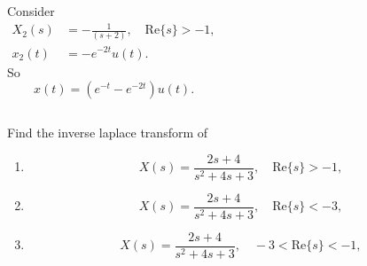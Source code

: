 \begin{frame}[t]{}
    {
        \begin{solution}\end{solution}
            \begin{columns}
                    
                    Consider
                    \begin{align*}
                        X_2(s) &= -\frac{1}{(s+2)}, \quad \mathrm{Re}\{s\} > -1,\\
                        x_2(t) &= -e^{-2t}u(t).
                    \end{align*}
                    So
                    \begin{equation*}
                        x(t) = (e^{-t} -e^{-2t})u(t).
                    \end{equation*}
            \end{columns}

    }
\end{frame}



\begin{frame}[t]{}
    \begin{example}
        Find the inverse laplace transform of
        \begin{enumerate}
            \item
            \begin{equation*}
                X(s) = \frac{2s+4}{s^2 + 4s+ 3}, \quad \mathrm{Re}\{s\} > -1,
            \end{equation*}
            \item
            \begin{equation*}
                X(s) = \frac{2s+4}{s^2 + 4s+ 3}, \quad \mathrm{Re}\{s\} < -3,
            \end{equation*}
            \item
            \begin{equation*}
                X(s) = \frac{2s+4}{s^2 + 4s+ 3}, \quad -3 < \mathrm{Re}\{s\} < -1,
            \end{equation*}
        \end{enumerate}
    \end{example}
\end{frame}


